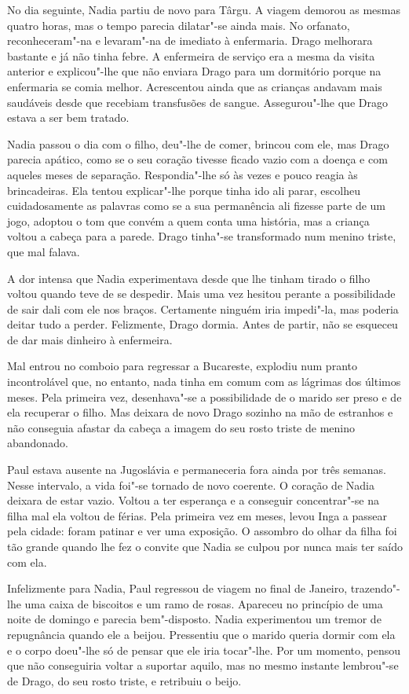 No dia seguinte, Nadia partiu de novo para Târgu. A viagem demorou as
mesmas quatro horas, mas o tempo parecia dilatar"-se ainda mais. No
orfanato, reconheceram"-na e levaram"-na de imediato à enfermaria. Drago melhorara bastante e
já não tinha febre. A enfermeira de serviço era a mesma da visita
anterior e explicou"-lhe que não enviara Drago para um dormitório porque
na enfermaria se comia melhor. Acrescentou ainda que as crianças andavam mais saudáveis desde que recebiam transfusões de sangue.
Assegurou"-lhe que Drago estava a ser bem tratado.

Nadia passou o dia com
o filho, deu"-lhe de comer, brincou com ele, mas Drago parecia apático,
como se o seu coração tivesse ficado vazio com a doença e com aqueles
meses de separação. Respondia"-lhe só às vezes e pouco reagia às
brincadeiras. Ela tentou explicar"-lhe porque tinha ido ali parar,
escolheu cuidadosamente as palavras como se a sua permanência ali
fizesse parte de um jogo, adoptou o tom que convém a quem conta uma
história, mas a criança voltou a cabeça para a parede. Drago tinha"-se
transformado num menino triste, que mal falava.

A dor intensa que Nadia experimentava desde que lhe tinham tirado o
filho voltou quando teve de se despedir. Mais uma vez hesitou perante a
possibilidade de sair dali com ele nos braços. Certamente ninguém iria
impedi"-la,
mas poderia deitar tudo a perder. Felizmente, Drago dormia. Antes de
partir, não se esqueceu de dar mais dinheiro à enfermeira.

Mal entrou no comboio para regressar a Bucareste, explodiu num pranto
incontrolável que, no entanto, nada tinha em comum com as lágrimas dos
últimos meses. Pela primeira vez, desenhava"-se a possibilidade de o
marido ser preso e de ela recuperar o filho. Mas deixara de novo Drago
sozinho na mão de estranhos e não conseguia afastar da cabeça a imagem
do seu rosto triste de menino abandonado.

Paul estava ausente na Jugoslávia e permaneceria fora ainda por três
semanas. Nesse intervalo, a vida foi"-se tornado de novo coerente. O
coração de Nadia deixara de estar vazio. Voltou a ter esperança e a
conseguir concentrar"-se na filha mal ela voltou de férias. Pela primeira vez em meses, levou
Inga a passear pela cidade: foram patinar e ver uma exposição. O
assombro do olhar da filha foi tão grande quando lhe fez o convite que
Nadia se culpou por nunca mais ter saído com ela.

Infelizmente para Nadia, Paul regressou de viagem no final de Janeiro,
trazendo"-lhe uma caixa de biscoitos e um ramo de rosas. Apareceu no
princípio de uma noite de domingo e parecia bem"-disposto. Nadia
experimentou um tremor de repugnância quando ele a beijou. Pressentiu
que o marido queria dormir com ela e o corpo doeu"-lhe só de pensar que
ele iria tocar"-lhe. Por um momento, pensou que não conseguiria voltar a
suportar aquilo, mas no mesmo instante lembrou"-se de Drago, do seu rosto
triste, e retribuiu o beijo.

